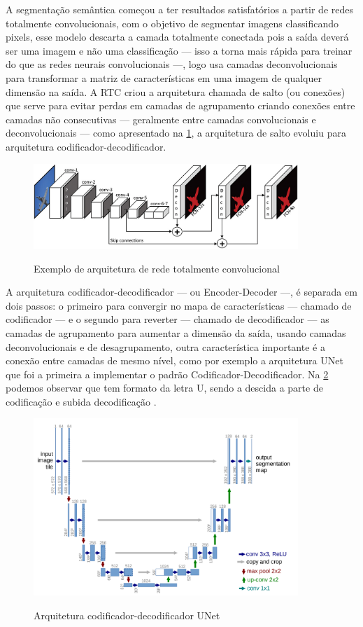 A segmentação semântica começou a ter resultados satisfatórios a partir de redes totalmente convolucionais, com o objetivo de segmentar imagens classificando pixels, esse modelo descarta a camada totalmente conectada pois a saída deverá ser uma imagem e não uma classificação — isso a torna mais rápida para treinar do que as redes neurais convolucionais —, logo usa camadas deconvolucionais para transformar a matriz de características em uma imagem de qualquer dimensão na saída. A RTC criou a arquitetura chamada de salto (ou conexões) que serve para evitar perdas em camadas de agrupamento criando conexões entre camadas não consecutivas — geralmente entre camadas convolucionais e deconvolucionais — como apresentado na \cref{fig:rtc}, a arquitetura de salto evoluiu para arquitetura codificador-decodificador.
\begin{figure}[H]
	\caption{Exemplo de arquitetura de rede totalmente convolucional}
	\centering %
	\includegraphics[width=10cm]{figures/redes_totalmente_convolucionais.jpeg} %
	\label{fig:rtc}
\end{figure}

A arquitetura codificador-decodificador — ou Encoder-Decoder —, é separada em dois passos: o primeiro para convergir no mapa de características — chamado de codificador — e o segundo para reverter — chamado de decodificador — as camadas de agrupamento para aumentar a dimensão da saída, usando camadas deconvolucionais e de desagrupamento, outra característica importante é a conexão entre camadas de mesmo nível, como por exemplo a arquitetura UNet que foi a primeira a implementar o padrão Codificador-Decodificador. Na \cref{fig:unet} podemos observar que tem formato da letra U, sendo a descida a parte de codificação e subida decodificação \cite{dp_semantic_segmantation, lapix, unetArq}.

\begin{figure}[H]
	\caption{Arquitetura codificador-decodificador UNet}
	\centering %
	\includegraphics[width=10cm]{figures/unet.png} %
	\label{fig:unet}
\end{figure}

